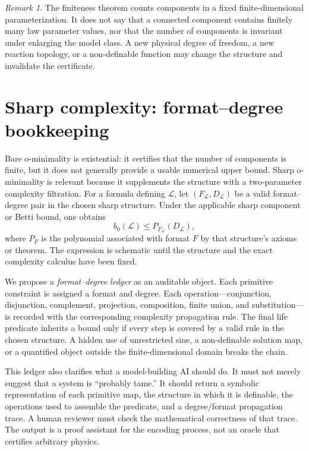 \documentclass[11pt,a4paper]{article}
\theoremstyle{definition}
\theoremstyle{remark}
\newtheorem{remark}[theorem]{Remark}
\newcommand{\Life}{\mathcal{L}}
\begin{document}
\begin{remark}
The finiteness theorem counts components in a fixed finite-dimensional parameterization. It does not say that a connected component contains finitely many law parameter values, nor that the number of components is invariant under enlarging the model class. A new physical degree of freedom, a new reaction topology, or a non-definable function may change the structure and invalidate the certificate.
\end{remark}

\section{Sharp complexity: format--degree bookkeeping}
Bare o-minimality is existential: it certifies that the number of components is finite, but it does not generally provide a usable numerical upper bound. Sharp o-minimality is relevant because it supplements the structure with a two-parameter complexity filtration. For a formula defining \(\Life\), let \((F_\Life,D_\Life)\) be a valid format--degree pair in the chosen sharp structure. Under the applicable sharp component or Betti bound, one obtains
\[
 b_0(\Life)\leq P_{F_\Life}(D_\Life),
\]
where \(P_F\) is the polynomial associated with format \(F\) by that structure's axioms or theorem. The expression is schematic until the structure and the exact complexity calculus have been fixed.

We propose a \emph{format--degree ledger} as an auditable object. Each primitive constraint is assigned a format and degree. Each operation---conjunction, disjunction, complement, projection, composition, finite union, and substitution---is recorded with the corresponding complexity propagation rule. The final life predicate inherits a bound only if every step is covered by a valid rule in the chosen structure. A hidden use of unrestricted sine, a non-definable solution map, or a quantified object outside the finite-dimensional domain breaks the chain.

This ledger also clarifies what a model-building AI should do. It must not merely suggest that a system is ``probably tame.'' It should return a symbolic representation of each primitive map, the structure in which it is definable, the operations used to assemble the predicate, and a degree/format propagation trace. A human reviewer must check the mathematical correctness of that trace. The output is a proof assistant for the encoding process, not an oracle that certifies arbitrary physics.
\end{document}
